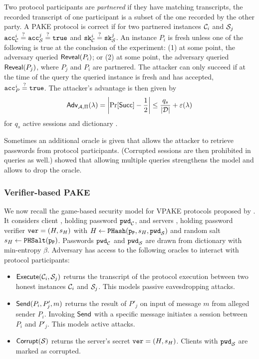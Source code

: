 \noindent
Two protocol participants are \emph{partnered} if they have matching transcripts, \ie the recorded transcript of one participant is a subset of the one recorded by the other party.
A PAKE protocol is correct if for two partnered instances $\mathcal{C}_i$ and $\mathcal{S}_j$ $\mathtt{acc}_\mathcal{C}^i\stackrel{?}{=}\mathtt{acc}_\mathcal{S}^j\stackrel{?}{=}\mathtt{true}$ and $\mathtt{sk}_\mathcal{C}^i\stackrel{?}{=} \mathtt{sk}_\mathcal{S}^j$.
An instance $P_i$ is fresh unless one of the following is true at the conclusion of the experiment: (1) at some point, the adversary queried $\mathsf{Reveal}(P_i)$; or (2) at some point, the adversary queried $\mathsf{Reveal}(P_j)$, where $P_j$ and $P_i$ are partnered.
The attacker can only succeed if at the time of the \Test query the queried instance is fresh and has accepted, \ie $\mathtt{acc}_P^i\stackrel{?}{=}\mathtt{true}$.
The attacker's advantage is then given by
\[
  \mathsf{Adv}_{\mathcal{A},\Pi}(\lambda) = \left| \Pr[\mathsf{Succ}] - \frac12 \right| \leq \frac{q_s}{|\mathcal{D}|} + \varepsilon(\lambda)
\]
for $q_s$ active sessions and dictionary \cD.

Sometimes an additional \Corrupt oracle is given that allows the attacker to retrieve passwords from protocol participants.
(Corrupted sessions are then prohibited in \Test queries as well.)
\citet{Abdalla2005} showed that allowing multiple \Test queries strengthens the model and allows to drop the \Reveal oracle.


\subsubsection{Verifier-based PAKE} \label{sec:vpake-model}
We now recall the game-based security model for \ac{VPAKE} protocols proposed by \citet{BenhamoudaP13}.
It considers client \Client, holding password $\mathtt{pwd}_\mathcal{C}$, and servers \Server, holding password verifier $\mathtt{ver}=(H,s_H)$ with $H\gets\mathtt{PHash}(\mathtt{p_P}, s_H, \mathtt{pwd}_\mathcal{S})$ and random salt $s_H\gets\mathtt{PHSalt}(\mathtt{p_P})$.
Passwords $\mathtt{pwd}_\mathcal{C}$ and $\mathtt{pwd}_\mathcal{S}$ are drawn from dictionary \cD with min-entropy $\beta$.
Adversary \cA has access to the following oracles to interact with protocol participants:

\begin{itemize}
	\item $\mathsf{Execute}(\mathcal{C}_i,\mathcal{S}_j)$ returns the transcript of the protocol execution between two honest instances $\mathcal{C}_i$ and $\mathcal{S}_j$.
		This models passive eavesdropping attacks.
	
	\item $\mathsf{Send}(P_i, P'_j, m)$ returns the result of $P'_j$ on input of message $m$ from alleged sender $P_i$.
		Invoking $\mathsf{Send}$ with a specific message initiates a session between $P_i$ and $P'_j$.
		This models active attacks.
		
	\item $\mathsf{Corrupt}(\mathcal{S})$ returns the server's secret $\mathtt{ver}=(H,s_H)$.
		Clients with $\mathtt{pwd}_\mathcal{S}$ are marked as corrupted.
\end{itemize}

